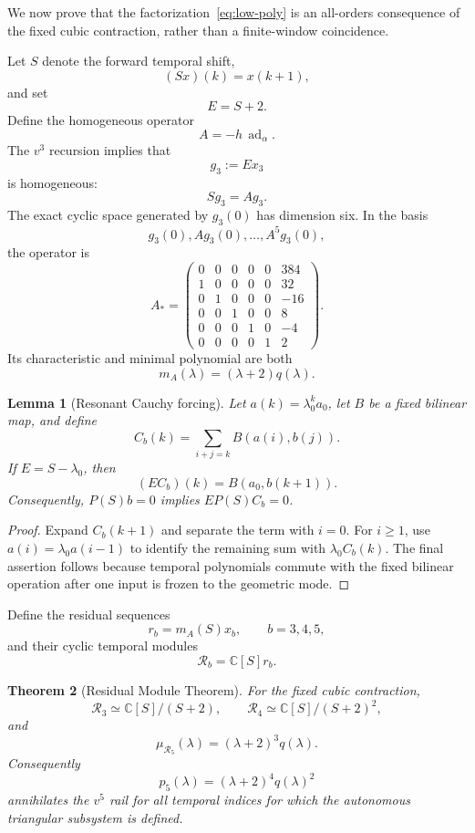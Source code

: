 \documentclass[11pt]{amsart}
\newtheorem{theorem}{Theorem}[section]
\newtheorem{lemma}[theorem]{Lemma}
\newcommand{\C}{\mathbb C}
\begin{document}
We now prove that the factorization~\eqref{eq:low-poly} is an all-orders consequence of the fixed cubic contraction, rather than a finite-window coincidence.

Let $S$ denote the forward temporal shift,
\[
(Sx)(k)=x(k+1),
\]
and set
\[
E=S+2.
\]
Define the homogeneous operator
\[
A=-h\,\operatorname{ad}_\alpha.
\]
The $v^3$ recursion implies that
\[
g_3:=Ex_3
\]
is homogeneous:
\[
Sg_3=Ag_3.
\]
The exact cyclic space generated by $g_3(0)$ has dimension six.  In the basis
\[
g_3(0),Ag_3(0),\ldots,A^5g_3(0),
\]
the operator is
\begin{equation}\label{eq:Astar}
A_*=\begin{pmatrix}
0&0&0&0&0&384\\
1&0&0&0&0&32\\
0&1&0&0&0&-16\\
0&0&1&0&0&8\\
0&0&0&1&0&-4\\
0&0&0&0&1&2
\end{pmatrix}.
\end{equation}
Its characteristic and minimal polynomial are both
\begin{equation}\label{eq:mA}
\boxed{m_A(\lambda)=(\lambda+2)q(\lambda).}
\end{equation}

\begin{lemma}[Resonant Cauchy forcing]\label{lem:cauchy-resonance}
Let $a(k)=\lambda_0^ka_0$, let $B$ be a fixed bilinear map, and define
\[
C_b(k)=\sum_{i+j=k}B(a(i),b(j)).
\]
If $E=S-\lambda_0$, then
\[
(EC_b)(k)=B(a_0,b(k+1)).
\]
Consequently, $P(S)b=0$ implies $EP(S)C_b=0$.
\end{lemma}

\begin{proof}
Expand $C_b(k+1)$ and separate the term with $i=0$.  For $i\ge1$, use $a(i)=\lambda_0a(i-1)$ to identify the remaining sum with $\lambda_0C_b(k)$.  The final assertion follows because temporal polynomials commute with the fixed bilinear operation after one input is frozen to the geometric mode.
\end{proof}

Define the residual sequences
\[
r_b=m_A(S)x_b,
\qquad b=3,4,5,
\]
and their cyclic temporal modules
\[
\mathcal R_b=\C[S]r_b.
\]

\begin{theorem}[Residual Module Theorem]\label{thm:residual-modules}
For the fixed cubic contraction,
\[
\boxed{
\mathcal R_3\simeq \C[S]/(S+2),
\qquad
\mathcal R_4\simeq \C[S]/(S+2)^2,
}
\]
and
\[
\boxed{
\mu_{\mathcal R_5}(\lambda)=(\lambda+2)^3q(\lambda).
}
\]
Consequently
\[
\boxed{
p_5(\lambda)=(\lambda+2)^4q(\lambda)^2
}
\]
annihilates the $v^5$ rail for all temporal indices for which the autonomous triangular subsystem is defined.
\end{theorem}
\end{document}
